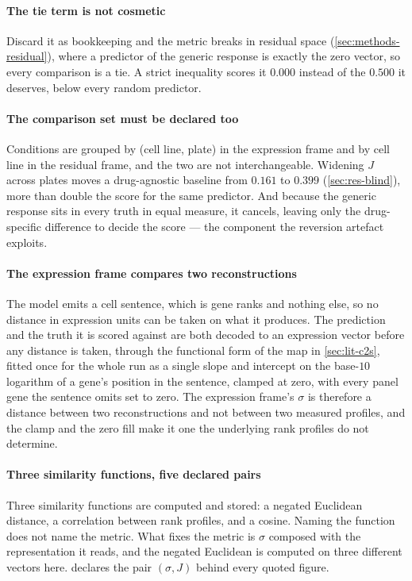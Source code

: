 \paragraph{The tie term is not cosmetic} Discard it as bookkeeping and the
metric breaks in residual space (\cref{sec:methods-residual}), where a predictor
of the generic response is exactly the zero vector, so every comparison is a
tie. A strict inequality scores it $0.000$ instead of the
$0.500$ it deserves, below every random predictor.

\paragraph{The comparison set must be declared too} Conditions are grouped by
(cell line, plate) in the expression frame and by cell line in the residual
frame, and the two are not interchangeable. Widening $J$ across plates moves a
drug-agnostic baseline from $0.161$ to $0.399$ (\cref{sec:res-blind}), more than
double the score for the same predictor. And because the generic
response sits in every truth in equal measure, it cancels, leaving only the
drug-specific difference to decide the score --- the component the reversion
artefact exploits.

\paragraph{The expression frame compares two reconstructions} The model emits a
cell sentence, which is gene ranks and nothing else, so no distance in expression
units can be taken on what it produces. The prediction and the truth it is scored
against are both decoded to an expression vector before any distance is
taken, through the functional form of the map in
\cref{sec:lit-c2s}, fitted once for the whole run as a single slope and
intercept on the base-$10$ logarithm of a gene's position in the sentence,
clamped at zero, with every panel gene the sentence omits set to zero. The
expression frame's $\sigma$ is therefore a distance between two reconstructions
and not between two measured profiles, and the clamp and the zero fill make it
one the underlying rank profiles do not determine.

\paragraph{Three similarity functions, five declared pairs} Three similarity
functions are computed and stored: a negated Euclidean distance, a correlation
between rank profiles, and a cosine. Naming the function does not name the
metric. What fixes the metric is $\sigma$ composed with the representation it
reads, and the negated Euclidean is computed on three different vectors here.
 declares the pair $(\sigma, J)$ behind every quoted figure.

